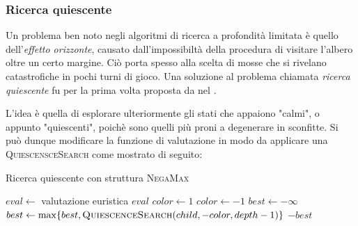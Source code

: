 \documentclass{article}
\begin{document}
\subsubsection*{Ricerca quiescente}

Un problema ben noto negli algoritmi di ricerca a profondit\`a limitata \`e
quello dell'\emph{effetto orizzonte}, causato dall'impossibilt\`a della procedura
di visitare l'albero oltre un certo margine. Ci\`o porta spesso alla scelta di
mosse che si rivelano catastrofiche in pochi turni di gioco. Una soluzione al
problema chiamata \emph{ricerca quiescente} \cite{quiescence} fu per la prima
volta proposta  da \citeauthor{quiescence} nel \citeyear{quiescence}.

L'idea \`e quella di esplorare ulteriormente gli stati che appaiono "calmi", o
appunto "quiescenti", poich\`e sono quelli pi\`u proni a degenerare in sconfitte.
Si pu\`o dunque modificare la funzione di valutazione in modo da applicare una
\textsc{QuiescensceSearch} come mostrato di seguito:

\begin{algorithm}
  \caption{Ricerca quiescente con struttura \textsc{NegaMax}}
  \label{qs}
  \begin{algorithmic}[0]
      \State $eval \gets $ valutazione euristica
        \State \Return $eval$
      \Else
        \State $color \gets 1$
          \State $color \gets -1$
        \EndIf
        \State \Return {}
      \EndIf
    \EndProcedure
    \Statex
      \State \Return {}
    \EndIf
    \State $best \gets -\infty$
      \State $best \gets \max\{best, \Call{QuiescenceSearch}{child, -color, depth-1}\}$
    \EndFor
    \State \Return $-best$
    \EndProcedure
  \end{algorithmic}
\end{algorithm}


\pagebreak


\end{document}
